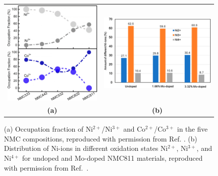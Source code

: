 \documentclass[journal=jacsat,manuscript=article]{achemso}
\begin{document}
\begin{figure}[tb]
    \begin{center}
        \begin{tabular}{c c}
            \includegraphics[width=0.44\columnwidth]{Figures/NMC-Sun-Ox-State-1-a.jpeg}&\includegraphics[width=0.46\columnwidth]{Figures/NMC-Susai-Ox-State-1-b.jpeg}\\
            \textbf{(a)}&\textbf{(b)}\\
        \end{tabular}
        \caption{\label{fig:Ox-State} (a) Occupation fraction of Ni$^{2+}$/Ni$^{3+}$  and Co$^{2+}$/Co$^{3+}$ in the five NMC compositions, reproduced with permission from Ref. . (b) Distribution of Ni-ions in different oxidation states Ni$^{2+}$, Ni$^{3+}$, and Ni$^{4+}$ for undoped and Mo-doped NMC811 materials, reproduced with permission from Ref.~.}
    \end{center}
\end{figure}
\end{document}
